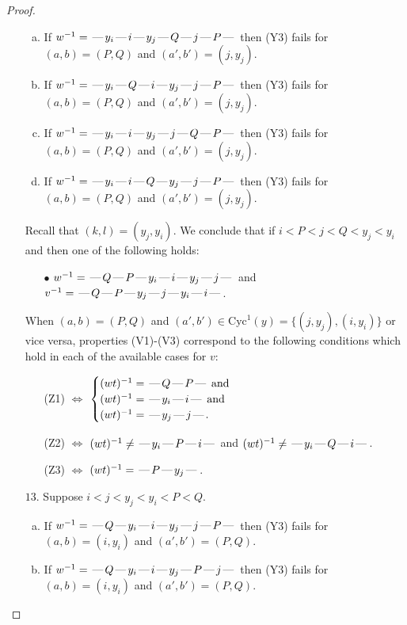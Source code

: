 \documentclass[10pt]{article}
\theoremstyle{definition}
\theoremstyle{definition}
\def\dash{\text{\hspace{0.5mm}---\hspace{0.5mm}}}
\def\Cyc{\mathrm{Cyc}}
\begin{document}
\begin{proof}
\begin{enumerate}
\begin{enumerate}[(a)]
\item If $w^{-1} = \dash y_i\dash i\dash y_j\dash Q\dash j\dash P\dash $ then (Y3) fails for $(a,b)=(P,Q)$ and $(a',b')=(j,y_j)$.
\item If $w^{-1} = \dash y_i\dash Q\dash i\dash y_j\dash j\dash P\dash $ then (Y3) fails for $(a,b)=(P,Q)$ and $(a',b')=(j,y_j)$.
\item If $w^{-1} = \dash y_i\dash i\dash y_j\dash j\dash Q\dash P\dash $ then (Y3) fails for $(a,b)=(P,Q)$ and $(a',b')=(j,y_j)$.
\item If $w^{-1} = \dash y_i\dash i\dash Q\dash y_j\dash j\dash P\dash $ then (Y3) fails for $(a,b)=(P,Q)$ and $(a',b')=(j,y_j)$.
\end{enumerate}
Recall that $(k,l) = (y_j,y_i)$.
We conclude that if $i < P < j < Q < y_j < y_i$ and then one of the following holds:
\begin{enumerate}
\item[$\bullet$] $w^{-1} = \dash Q\dash P\dash y_i\dash i\dash y_j\dash j\dash $ and $v^{-1} = \dash Q\dash P\dash y_j\dash j\dash y_i\dash i\dash $.
\end{enumerate}
When $(a,b)= (P,Q)$ and $(a',b')\in \Cyc^1(y)=\{(j,y_j),(i,y_i)\}$ or vice versa,
properties (V1)-(V3) correspond to the following conditions which hold in
each of the available cases for $v$:
\begin{enumerate}
\item[](Z1) $\Leftrightarrow$ $\begin{cases}\text{$(wt)^{-1} = \dash Q \dash P \dash$}\text{ and }\\
\text{$(wt)^{-1} = \dash y_i \dash i \dash$}\text{ and }\\
\text{$(wt)^{-1} = \dash y_j \dash j \dash$}.\end{cases}$
\item[](Z2) $\Leftrightarrow$ $(wt)^{-1} \neq \dash y_i \dash P \dash i \dash$ and $(wt)^{-1}\neq \dash y_i \dash Q \dash i \dash$.
\item[](Z3) $\Leftrightarrow$ $(wt)^{-1} = \dash P \dash y_j \dash$.
\end{enumerate}
\item[$13$.] Suppose $i < j < y_j < y_i < P < Q$.
\begin{enumerate}[(a)]
\item If $w^{-1} = \dash Q\dash y_i\dash i\dash y_j\dash j\dash P\dash $ then (Y3) fails for $(a,b)=(i,y_i)$ and $(a',b')=(P,Q)$.
\item If $w^{-1} = \dash Q\dash y_i\dash i\dash y_j\dash P\dash j\dash $ then (Y3) fails for $(a,b)=(i,y_i)$ and $(a',b')=(P,Q)$.

\end{enumerate}
\end{enumerate}
\end{proof}
\end{document}

